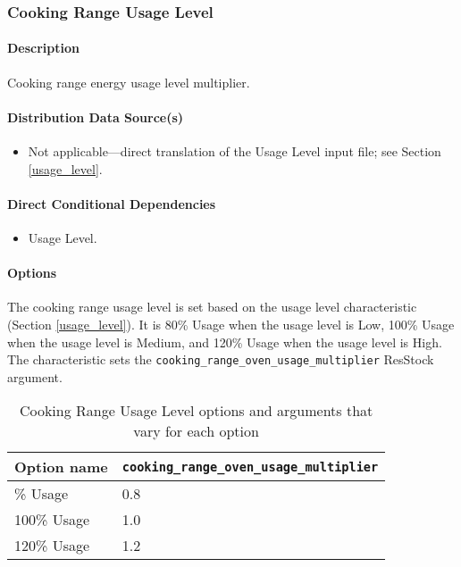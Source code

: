 \subsubsection{Cooking Range Usage Level}\label{cooking_range_usage_level}
\paragraph{Description}
Cooking range energy usage level multiplier.

\paragraph{Distribution Data Source(s)}
\begin{itemize}
\item 
Not applicable---direct translation of the Usage Level input file; see Section \ref{usage_level}.
\end{itemize}
\paragraph{Direct Conditional Dependencies}
\begin{itemize}
    \item Usage Level.
\end{itemize}

\paragraph{Options}
The cooking range usage level is set based on the usage level characteristic (Section \ref{usage_level}). It is 80\% Usage when the usage level is Low, 100\% Usage when the usage level is Medium, and 120\% Usage when the usage level is High. The characteristic sets the \texttt{cooking\_range\_oven\_usage\_multiplier} ResStock argument.
\begin{longtable}[]{ |p{3cm}|p{8cm}| }
\caption{Cooking Range Usage Level options and arguments that vary for each option} \label{table:hc_opt_cooking} \\
\toprule\noalign{}
Option name & 
\texttt{cooking\_range\_oven\_usage\_multiplier} \\
\midrule\noalign{}
\endhead
\bottomrule\noalign{}
\endlastfoot
80\% Usage & 0.8 \\
100\% Usage & 1.0 \\
120\% Usage & 1.2 \\
\end{longtable}

